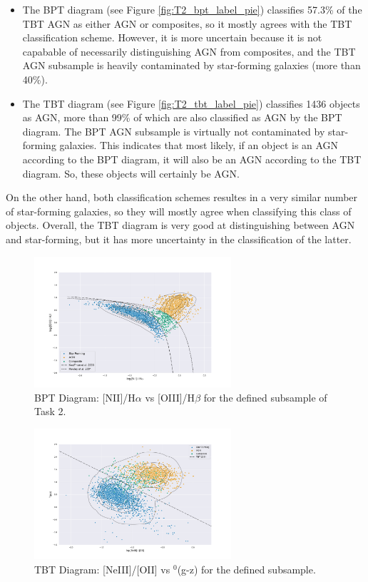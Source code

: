 \documentclass[letterpaper, oneside]{article}
\begin{document}
	\begin{itemize}
		\item The BPT diagram (see Figure \ref{fig:T2_bpt_label_pie}) classifies 57.3\% of the TBT AGN as either AGN or composites, so it mostly agrees with the TBT classification scheme. However, it is more uncertain because it is not capabable of necessarily distinguishing AGN from composites, and the TBT AGN subsample is heavily contaminated by star-forming galaxies (more than 40\%).

		\item The TBT diagram (see Figure \ref{fig:T2_tbt_label_pie}) classifies 1436 objects as AGN, more than 99\% of which are also classified as AGN by the BPT diagram. The BPT AGN subsample is virtually not contaminated by star-forming galaxies. This indicates that most likely, if an object is an AGN according to the BPT diagram, it will also be an AGN according to the TBT diagram. So, these objects will certainly be AGN.

	\end{itemize}

	On the other hand, both classification schemes resultes in a very similar number of star-forming galaxies, so they will mostly agree when classifying this class of objects. Overall, the TBT diagram is very good at distinguishing between AGN and star-forming, but it has more uncertainty in the classification of the latter.
	
	\begin{figure}[H]
		\centering
		\includegraphics[width=0.65\textwidth]{../BPT_Diagrams/BPT_sub_niiHa_oiiiHb.pdf}
		\caption{BPT Diagram: [NII]/H$\alpha$ vs [OIII]/H$\beta$ for the defined subsample of Task 2.}
		\label{fig:BPT_subsample_niiHa_oiiiHb}
	\end{figure}

	\begin{figure}[H]
		\centering
		\includegraphics[width=0.65\textwidth]{../TBT_diagrams/TBT_full_subsample.pdf}
		\caption{TBT Diagram: [NeIII]/[OII] vs $^0$(g-z) for the defined subsample.}
		\label{fig:TBT_subsample}
	\end{figure}
\end{document}
